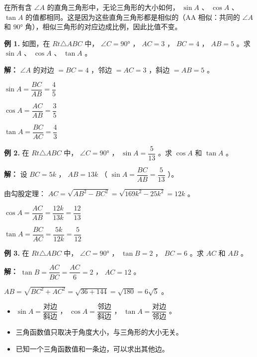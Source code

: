 在所有含 $\angle A$ 的直角三角形中，无论三角形的大小如何， $\sin A$ 、 $\cos A$ 、 $\tan A$ 的值都相同。这是因为这些直角三角形都是相似的（AA 相似：共同的 $\angle A$ 和 $90°$ 角），相似三角形的对应边成比例，因此比值不变。

\begin{workedexamples}


\textbf{例 1.} 如图，在 $Rt\triangle ABC$ 中， $\angle C = 90°$ ， $AC = 3$ ， $BC = 4$ ， $AB = 5$ 。求 $\sin A$ 、 $\cos A$ 、 $\tan A$ 。

\textbf{解：}
$\angle A$ 的对边 $= BC = 4$ ，邻边 $= AC = 3$ ，斜边 $= AB = 5$ 。

$\sin A = \dfrac{BC}{AB} = \dfrac{4}{5}$

$\cos A = \dfrac{AC}{AB} = \dfrac{3}{5}$

$\tan A = \dfrac{BC}{AC} = \dfrac{4}{3}$

\textbf{例 2.} 在 $Rt\triangle ABC$ 中， $\angle C = 90°$ ， $\sin A = \dfrac{5}{13}$ 。求 $\cos A$ 和 $\tan A$ 。

\textbf{解：}
设 $BC = 5k$ ， $AB = 13k$ （ $\sin A = \dfrac{BC}{AB} = \dfrac{5}{13}$ ）。

由勾股定理： $AC = \sqrt{AB^2 - BC^2} = \sqrt{169k^2 - 25k^2} = 12k$ 。

$\cos A = \dfrac{AC}{AB} = \dfrac{12k}{13k} = \dfrac{12}{13}$

$\tan A = \dfrac{BC}{AC} = \dfrac{5k}{12k} = \dfrac{5}{12}$

\textbf{例 3.} 在 $Rt\triangle ABC$ 中， $\angle C = 90°$ ， $\tan B = 2$ ， $BC = 6$ 。求 $AC$ 和 $AB$ 。

\textbf{解：}
$\tan B = \dfrac{AC}{BC} = \dfrac{AC}{6} = 2$ ， $AC = 12$ 。

$AB = \sqrt{BC^2 + AC^2} = \sqrt{36 + 144} = \sqrt{180} = 6\sqrt{5}$ 。

\end{workedexamples}

\begin{keytakeaway}


\begin{itemize}
  \item $\sin A = \dfrac{\text{对边}}{\text{斜边}}$ ， $\cos A = \dfrac{\text{邻边}}{\text{斜边}}$ ， $\tan A = \dfrac{\text{对边}}{\text{邻边}}$ 。
  \item 三角函数值只取决于角度大小，与三角形的大小无关。
  \item 已知一个三角函数值和一条边，可以求出其他边。
\end{itemize}


\end{keytakeaway}

